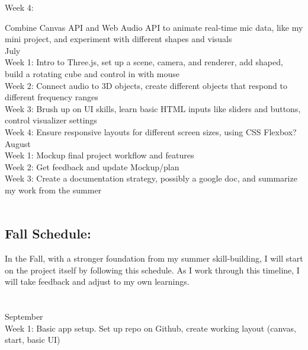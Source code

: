 \documentclass[10pt,twocolumn]{article}
\begin{document}
    Week 4:

    Combine Canvas API and Web Audio API to animate real-time mic data, like my mini project, and experiment with different shapes and visuals\\

July\\


    Week 1: 
    Intro to Three.js, set up a scene, camera, and renderer, add shaped, build a rotating cube and control in with mouse\\
    
    Week 2:
    Connect audio to 3D objects, create different objects that respond to different frequency ranges\\
    
    Week 3:
    Brush up on UI skills, learn basic HTML inputs like sliders and buttons, control visualizer settings\\
    
    Week 4: 
    Ensure responsive layouts for different screen sizes, using CSS Flexbox?\\

August\\


    Week 1:
    Mockup final project workflow and features\\
    
    Week 2:
    Get feedback and update Mockup/plan\\
    
    Week 3:
    Create a documentation strategy, possibly a google doc, and summarize my work from the summer\\
    \\


\subsection{Fall Schedule:}

In the Fall, with a stronger foundation from my summer skill-building, I will start on the project itself by following this schedule. As I work through this timeline, I will take feedback and adjust to my own learnings.\\\\\\

September\\

    Week 1: 
    Basic app setup. Set up repo on Github, create working layout (canvas, start, basic UI)\\
    
\end{document}
